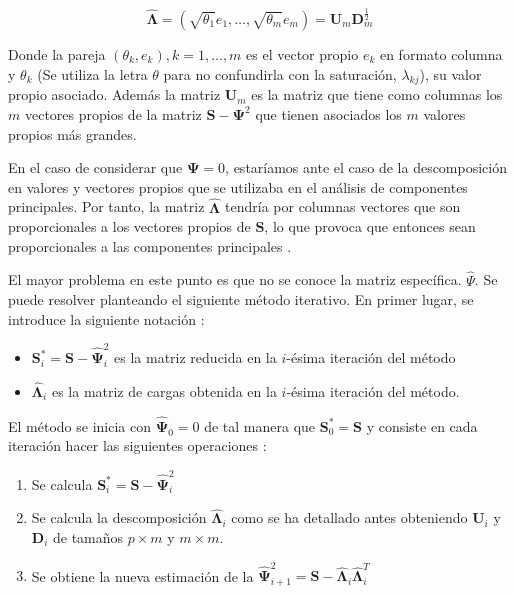 \begin{equation}
\mathbf{\hat{\Lambda}}=(\sqrt{\theta_1}e_1,\ldots,\sqrt{\theta_m}e_m)=\mathbf{U}_m\mathbf{D}_m^{\frac{1}{2}}
\end{equation}

\noindent Donde la pareja $(\theta_k, e_k), k=1, \ldots, m$ es el vector propio $e_k$ en formato columna y $\theta_k$ (Se utiliza la letra $\theta$ para no confundirla con la saturación, $\lambda_{kj}$), su valor propio asociado. Además la matriz $\mathbf{U}_m$ es la matriz que tiene como columnas los $m$ vectores propios de la matriz $\mathbf{S}-\mathbf{\Psi}^2$ que tienen asociados los $m$ valores propios más grandes. 

\noindent En el caso de considerar que $\mathbf{\Psi}=0$, estaríamos ante el caso de la descomposición en valores y vectores propios que se utilizaba en el análisis de componentes principales. Por tanto, la matriz $\mathbf{\hat{\Lambda}}$ tendría por columnas vectores que son proporcionales a los vectores propios de $\mathbf{S}$, lo que provoca que entonces sean proporcionales a las componentes principales \cite{Rencher 2002}. 

\noindent El mayor problema en este punto es que no se conoce la matriz específica.  $\hat{\Psi}$. Se puede resolver planteando el siguiente método iterativo. En primer lugar, se introduce la siguiente notación :
\begin{itemize}
\item $\mathbf{S}_i^*=\mathbf{S}-\hat{\mathbf{\Psi}}_i^2$ es la matriz reducida en la $i$-ésima iteración del método
\item $\mathbf{\hat{\Lambda}}_i$ es la matriz de cargas obtenida en la $i$-ésima iteración del método. 
\end{itemize}
\noindent El método se inicia con $\mathbf{\hat{\Psi}}_0=0$ de tal manera que $\mathbf{S}_0^*=\mathbf{S}$ y consiste en cada iteración hacer las siguientes operaciones \cite{Cuadras 2014, Johnson 2007, Peña 2002}: 
\begin{enumerate}
\item Se calcula $\mathbf{S}_i^*=\mathbf{S-\hat{\Psi}}_i^2$
\item Se calcula la descomposición $\mathbf{\hat{\Lambda}}_i$ como se ha detallado antes obteniendo $\mathbf{U}_i$ y $\mathbf{D}_i$ de tamaños $p\times m $ y $m\times m$. 
\item Se obtiene la nueva estimación de la $\mathbf{\hat{\Psi}}_{i+1}^2=\mathbf{S}-\mathbf{\hat{\Lambda}}_i\mathbf{\hat{\Lambda}}_i^T$
\end{enumerate}

